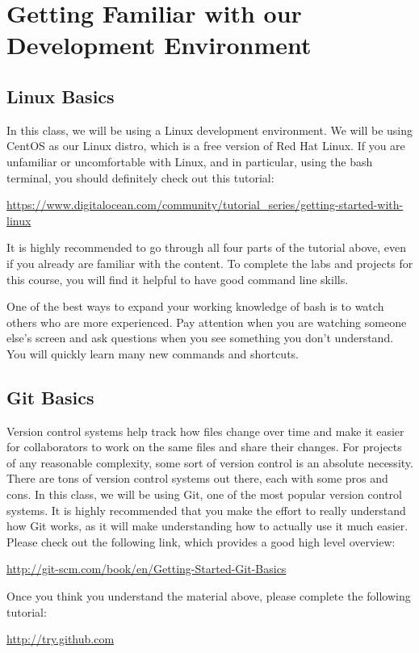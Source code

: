 \documentclass[11pt]{article}
\begin{document}
\section{Getting Familiar with our Development Environment}
\subsection{Linux Basics}
In this class, we will be using a Linux development environment. We will be using CentOS as our Linux distro, which is a free version of Red Hat Linux. If you are unfamiliar or uncomfortable with Linux, and in particular, using the bash terminal, you should definitely check out this tutorial:

\url{https://www.digitalocean.com/community/tutorial_series/getting-started-with-linux}

It is highly recommended to go through all four parts of the tutorial above, even if you already are familiar with the content. To complete the labs and projects for this course, you will find it helpful to have good command line skills.

One of the best ways to expand your working knowledge of bash is to watch others who are more experienced. Pay attention when you are watching someone else's screen and ask questions when you see something you don't understand. You will quickly learn many new commands and shortcuts.

\subsection{Git Basics}
Version control systems help track how files change over time and make it easier for collaborators to work on the same files and share their changes. For projects of any reasonable complexity, some sort of version control is an absolute necessity. There are tons of version control systems out there, each with some pros and cons. In this class, we will be using Git, one of the most popular version control systems. It is highly recommended that you make the effort to really understand how Git works, as it will make understanding how to actually use it much easier. Please check out the following link, which provides a good high level overview:

\url{http://git-scm.com/book/en/Getting-Started-Git-Basics}

Once you think you understand the material above, please complete the following tutorial:

\url{http://try.github.com}
\end{document}
